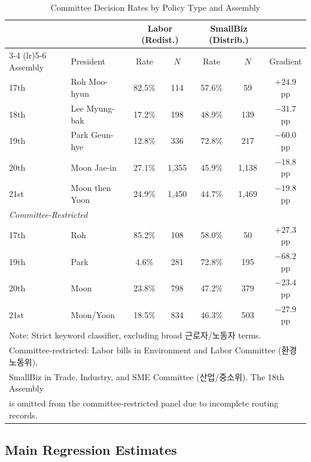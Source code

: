 \documentclass[11pt]{article}
\begin{document}
\begin{table}[H]
\centering
\caption{Committee Decision Rates by Policy Type and Assembly}
\label{tab:rates}
\begin{tabular}{llccccc}
\toprule
 & & \multicolumn{2}{c}{Labor (Redist.)} & \multicolumn{2}{c}{SmallBiz (Distrib.)} & \\
\cmidrule(lr){3-4} \cmidrule(lr){5-6}
Assembly & President & Rate & $N$ & Rate & $N$ & Gradient \\
\midrule
17th & Roh Moo-hyun        & 82.5\% & 114   & 57.6\% & 59    & $+24.9$ pp \\
18th & Lee Myung-bak       & 17.2\% & 198   & 48.9\% & 139   & $-31.7$ pp \\
19th & Park Geun-hye       & 12.8\% & 336   & 72.8\% & 217   & $-60.0$ pp \\
20th & Moon Jae-in         & 27.1\% & 1,355 & 45.9\% & 1,138 & $-18.8$ pp \\
21st & Moon then Yoon      & 24.9\% & 1,450 & 44.7\% & 1,469 & $-19.8$ pp \\
\midrule
\multicolumn{2}{l}{\textit{Committee-Restricted}} & & & & & \\
17th & Roh               & 85.2\% & 108   & 58.0\% & 50    & $+27.3$ pp \\
19th & Park              & 4.6\%  & 281   & 72.8\% & 195   & $-68.2$ pp \\
20th & Moon              & 23.8\% & 798   & 47.2\% & 379   & $-23.4$ pp \\
21st & Moon/Yoon         & 18.5\% & 834   & 46.3\% & 503   & $-27.9$ pp \\
\bottomrule
\multicolumn{7}{l}{\footnotesize Note: Strict keyword classifier, excluding broad 근로자/노동자 terms.} \\
\multicolumn{7}{l}{\footnotesize Committee-restricted: Labor bills in Environment and Labor Committee (환경노동위),} \\
\multicolumn{7}{l}{\footnotesize SmallBiz in Trade, Industry, and SME Committee (산업/중소위). The 18th Assembly} \\
\multicolumn{7}{l}{\footnotesize is omitted from the committee-restricted panel due to incomplete routing records.} \\
\end{tabular}
\end{table}

\subsection{Main Regression Estimates}
\end{document}
